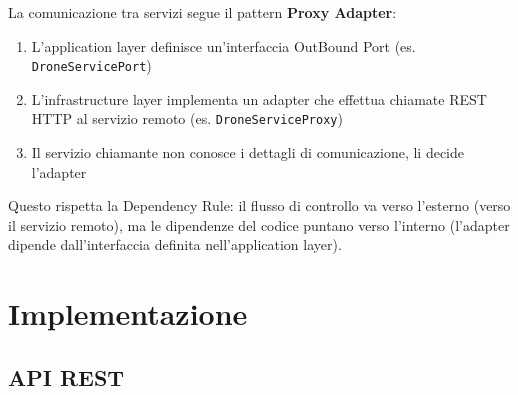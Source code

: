 \documentclass[12pt,a4paper]{article}
\begin{document}
La comunicazione tra servizi segue il pattern \textbf{Proxy Adapter}:

\begin{enumerate}
    \item L'application layer definisce un'interfaccia OutBound Port (es. \texttt{DroneServicePort})
    \item L'infrastructure layer implementa un adapter che effettua chiamate REST HTTP al servizio remoto (es. \texttt{DroneServiceProxy})
    \item Il servizio chiamante non conosce i dettagli di comunicazione, li decide l'adapter
\end{enumerate}

Questo rispetta la Dependency Rule: il flusso di controllo va verso l'esterno (verso il servizio remoto), ma le dipendenze del codice puntano verso l'interno (l'adapter dipende dall'interfaccia definita nell'application layer).

\section{Implementazione}
\subsection{API REST}
\end{document}
